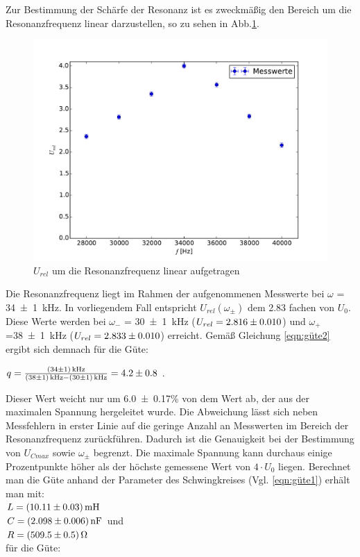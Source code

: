 Zur Bestimmung der Schärfe der Resonanz ist es zweckmäßig den Bereich um die
Resonanzfrequenz linear darzustellen, so zu sehen in Abb.\ref{fig:5clin}.
\begin{figure}
  \centering
  \includegraphics[width=\textwidth]{5c2.pdf}
  \caption{$U_{rel}$ um die Resonanzfrequenz linear aufgetragen}
  \label{fig:5clin}
\end{figure}
Die Resonanzfrequenz liegt im Rahmen der aufgenommenen Messwerte bei
$\omega$ = \SI{34 +- 1}{\kilo\hertz}.
In vorliegendem Fall entspricht $U_{rel}(\omega_{\pm})$ dem 2.83 fachen von $U_0$.
Diese Werte werden bei $\omega_-$ = \SI{30+-1}{\kilo\hertz}
($U_{rel}=\num{2.816+-0.01}$) und
$\omega_+$=\SI{38+-1}{\kilo\hertz} ($U_{rel} = \num{2.833+-0.01}$) erreicht.
Gemäß Gleichung \ref{eqn:güte2} ergibt
sich demnach für die Güte:

$q = \frac{\SI{34+-1}{\kilo\hertz}}{\SI{38+-1}{\kilo\hertz}-\SI{30+-1}
{\kilo\hertz}} = \num{4.2+-0.8}$ .

Dieser Wert weicht nur um \num{6.0+-0.17}\% von dem Wert ab, der aus der maximalen
Spannung hergeleitet wurde. Die Abweichung lässt sich neben Messfehlern in erster
Linie auf die geringe Anzahl an Messwerten im Bereich der Resonanzfrequenz
zurückführen. Dadurch ist die Genauigkeit bei der Bestimmung von
$U_{Cmax}$ sowie $\omega_\pm$ begrenzt. Die maximale Spannung kann durchaus
einige Prozentpunkte höher als der höchste gemessene Wert von $4\cdot U_0$
liegen.
Berechnet man die Güte anhand der Parameter des Schwingkreises
(Vgl. \ref{eqn:güte1}) erhält man mit: \\
$L = \SI{10.11 +- 0.03}{\milli\henry}$  \\
$C = \SI{2.098 +- 0.006}{\nano\farad}$ und \\
$R = \SI{509.5 +- 0.5}{\ohm}$ \\
für die Güte:

